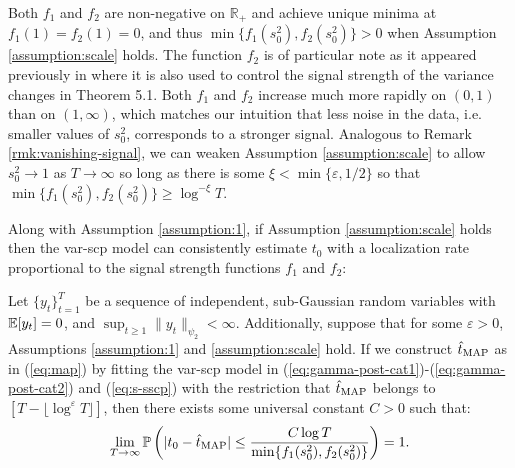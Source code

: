 \begin{remark}\label{rmk:var-signal}
Both $f_1$ and $f_2$ are non-negative on $\mathbb{R}_+$ and achieve unique minima at $f_1(1) = f_2(1) = 0$, and thus $\min\{f_1(s_0^2), f_2(s_0^2)\} > 0$ when Assumption \ref{assumption:scale} holds. The function $f_2$ is of particular note as it appeared previously in \cite{Bai10} where it is also used to control the signal strength of the variance changes in Theorem 5.1. Both $f_1$ and $f_2$ increase much more rapidly on $(0,1)$ than on $(1,\infty)$, which matches our intuition that less noise in the data, i.e. smaller values of $s_0^2$, corresponds to a stronger signal. Analogous to Remark \ref{rmk:vanishing-signal}, we can weaken Assumption \ref{assumption:scale} to allow $s_0^2 \to 1$ as $T \to \infty$ so long as there is some $\xi < \min\{\varepsilon, 1/2\}$ so that $\min\{f_1(s_0^2),f_2(s_0^2)\} \geq \log^{-\xi} T$. 
\end{remark}
\vspace{-5pt}

Along with Assumption \ref{assumption:1}, if Assumption \ref{assumption:scale} holds then the var-scp model can consistently estimate $t_0$ with a localization rate proportional to the signal strength functions $f_1$ and $f_2$: 
\begin{theorem}\label{theorem:sscp}
    Let $\{y_t\}_{t=1}^T$ be a sequence of independent, sub-Gaussian random variables with $\E[y_t]=0$, and $\sup_{t \geq 1} \lVert y_t\rVert_{\psi_2} < \infty$. Additionally, suppose that for some $\varepsilon >0$, Assumptions \ref{assumption:1} and \ref{assumption:scale} hold. If we construct $\hat{t}_{\normalfont \text{MAP}}$ as in (\ref{eq:map}) by fitting the var-scp model in (\ref{eq:gamma-post-cat1})-(\ref{eq:gamma-post-cat2}) and (\ref{eq:s-sscp}) with the restriction that $\hat{t}_{\normalfont \text{MAP}}$ belongs to $[T - \lfloor \log^\varepsilon T\rfloor]$, then there exists some universal constant $C > 0$ such that:
    \vspace{-5pt}
    \begin{align}
        \lim_{T\to\infty}\Pr\left(|t_0 - \hat{t}_{\normalfont \text{MAP}}| \leq \frac{C \log T}{\min\{f_1(s_0^2),f_2(s_0^2)\}} \right) = 1. \label{eq:thm-2}
    \end{align}
\end{theorem}
\vspace{-5pt}

